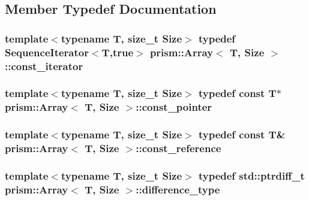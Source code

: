 \subsection{Member Typedef Documentation}
\subsubsection[{\texorpdfstring{const\+\_\+iterator}{const_iterator}}]{\setlength{\rightskip}{0pt plus 5cm}template$<$typename T, size\+\_\+t Size$>$ typedef {\bf Sequence\+Iterator}$<$T,true$>$ {\bf prism\+::\+Array}$<$ T, {\bf Size} $>$\+::{\bf const\+\_\+iterator}}\hypertarget{classprism_1_1_array_a187e11a8ec836c0b69b96b51fba73164}{}\label{classprism_1_1_array_a187e11a8ec836c0b69b96b51fba73164}
\subsubsection[{\texorpdfstring{const\+\_\+pointer}{const_pointer}}]{\setlength{\rightskip}{0pt plus 5cm}template$<$typename T, size\+\_\+t Size$>$ typedef const T$\ast$ {\bf prism\+::\+Array}$<$ T, {\bf Size} $>$\+::{\bf const\+\_\+pointer}}\hypertarget{classprism_1_1_array_a5aa9af8079a0a39654775076cc9d16e2}{}\label{classprism_1_1_array_a5aa9af8079a0a39654775076cc9d16e2}
\subsubsection[{\texorpdfstring{const\+\_\+reference}{const_reference}}]{\setlength{\rightskip}{0pt plus 5cm}template$<$typename T, size\+\_\+t Size$>$ typedef const T\& {\bf prism\+::\+Array}$<$ T, {\bf Size} $>$\+::{\bf const\+\_\+reference}}\hypertarget{classprism_1_1_array_a16161ca6c0027dfa1a7c678e820eedc3}{}\label{classprism_1_1_array_a16161ca6c0027dfa1a7c678e820eedc3}
\subsubsection[{\texorpdfstring{difference\+\_\+type}{difference_type}}]{\setlength{\rightskip}{0pt plus 5cm}template$<$typename T, size\+\_\+t Size$>$ typedef std\+::ptrdiff\+\_\+t {\bf prism\+::\+Array}$<$ T, {\bf Size} $>$\+::{\bf difference\+\_\+type}}\hypertarget{classprism_1_1_array_a0b64c4713d73faa944ecd7b0e3f648a8}{}\label{classprism_1_1_array_a0b64c4713d73faa944ecd7b0e3f648a8}
